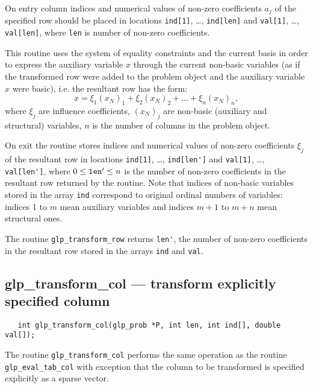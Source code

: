 On entry column indices and numerical values of non-zero coefficients
$a_j$ of the specified row should be placed in locations \verb|ind[1]|,
\dots, \verb|ind[len]| and \verb|val[1]|, \dots, \verb|val[len]|, where
\verb|len| is number of non-zero coefficients.

This routine uses the system of equality constraints and the current
basis in order to express the auxiliary variable $x$ through the current
non-basic variables (as if the transformed row were added to the problem
object and the auxiliary variable $x$ were basic), i.e. the resultant
row has the form:
$$x=\xi_1(x_N)_1+\xi_2(x_N)_2+\dots+\xi_n(x_N)_n,$$
where $\xi_j$ are influence coefficients, $(x_N)_j$ are non-basic
(auxiliary and structural) variables, $n$ is the number of columns in
the problem object.

On exit the routine stores indices and numerical values of non-zero
coefficients $\xi_j$ of the resultant row in locations \verb|ind[1]|,
\dots, \verb|ind[len']| and \verb|val[1]|, \dots, \verb|val[len']|,
where $0\leq{\tt len'}\leq n$ is the number of non-zero coefficients in
the resultant row returned by the routine. Note that indices of
non-basic variables stored in the array \verb|ind| correspond to
original ordinal numbers of variables: indices 1 to $m$ mean auxiliary
variables and indices $m+1$ to $m+n$ mean structural ones.

\returns

The routine \verb|glp_transform_row| returns \verb|len'|, the number of
non-zero coefficients in the resultant row stored in the arrays
\verb|ind| and \verb|val|.

\newpage

\subsection{glp\_transform\_col --- transform explicitly specified
column}

\synopsis

\begin{verbatim}
   int glp_transform_col(glp_prob *P, int len, int ind[], double val[]);
\end{verbatim}

\description

The routine \verb|glp_transform_col| performs the same operation as the
routine \verb|glp_eval_tab_col| with exception that the column to be
transformed is specified explicitly as a sparse vector.

